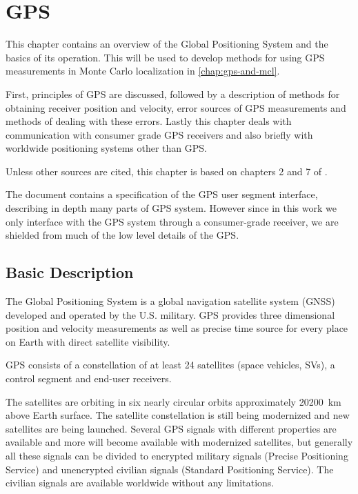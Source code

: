 \chapter{GPS}
\label{chap:gps}

This chapter contains an overview of the Global Positioning System and
the basics of its operation.
This will be used to develop methods for using GPS
measurements in Monte Carlo localization in \cref{chap:gps-and-mcl}.

First, principles of GPS are discussed, followed by a description of methods for
obtaining receiver position and velocity,
error sources of GPS measurements and methods of dealing with these errors.
Lastly this chapter deals with communication with consumer grade GPS receivers
and also briefly with worldwide positioning systems other than GPS.

Unless other sources are cited, this chapter is based on chapters
2 and 7 of \cite{kaplan06}.

The document \cite{fyfe92} contains a specification of the GPS user
segment interface, describing in depth many parts of GPS system.
However since in this work we only interface with the GPS system through a
consumer-grade receiver, we are shielded from much of the low level details of
the GPS.

\section{Basic Description}

The Global Positioning System is a global navigation satellite system (GNSS)
developed and operated by the U.S. military.
GPS provides three dimensional position and velocity measurements as well as
precise time source for every place on Earth with direct satellite visibility.

GPS consists of a constellation of at least 24 satellites (space vehicles, SVs),
a control segment and end-user receivers.

The satellites are orbiting in six nearly circular orbits approximately \SI{20200}{\kilo\meter}
above Earth surface.
The satellite constellation is still being modernized \cite{gps-modernization-www}
and new satellites are being launched.
Several GPS signals with different properties are available and more will become available
with modernized satellites,
but generally all these signals can be divided to encrypted military signals 
(Precise Positioning Service) and unencrypted
civilian signals (Standard Positioning Service).
The civilian signals are available worldwide without any limitations.


